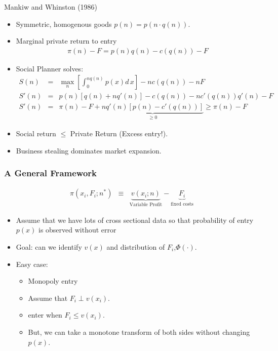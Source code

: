 \documentclass[aspectratio=169,11pt]{beamer}
\begin{document}
\begin{frame}{Mankiw and Whinston (1986)}
\begin{itemize}
\item Symmetric, homogenous goods $p(n) = p( n \cdot q(n))$.
\item Marginal private return to entry
\begin{eqnarray*}
\pi(n) - F = p(n) q(n) - c(q(n)) - F
\end{eqnarray*}
\item Social Planner solves:
\begin{eqnarray*}
S(n) &=& \max_n \left[ \int_0^{n q(n)} p(x) d\,x \right] - n c(q(n)) - nF \\
S'(n) &=&  p(n) [ q(n) + nq'(n)] - c(q(n)) - nc'(q(n)) q'(n) - F\\
S'(n) &=&  \pi(n) - F  + \underbrace{nq'(n) [p(n) - c'(q(n))] }_{\geq 0} \geq \pi(n) - F
\end{eqnarray*}
\item Social return $\leq $ Private Return (Excess entry!).
\item Business stealing dominates market expansion.
\end{itemize}
\end{frame} 

\begin{frame}
\frametitle{A General Framework}
\begin{eqnarray*}
\pi(x_i, F_i;  n^*) &\equiv& \underbrace{v(x_i;n)}_{\mbox{Variable Profit}} -\underbrace{F_i}_{\mbox{fixed costs}}
\end{eqnarray*}
\begin{itemize}
\item Assume that we have lots of cross sectional data so that probability of entry $p(x)$ is observed without error
\item Goal: can we identify $v(x)$ and distribution of $F_i$,$\Phi(\cdot)$.
\item Easy case: 
\begin{itemize}
\item Monopoly entry
\item Assume that $F_i \perp v(x_i)$.
\item enter when $F_i \leq v(x_i)$. \pause
\item But, we can take a monotone transform of both sides without changing $p(x)$.
\end{itemize}
\end{itemize}
\end{frame}
\end{document}
